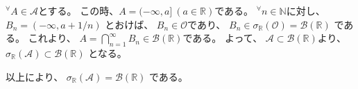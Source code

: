 \documentclass[12pt,b5paper]{ltjsarticle}
\begin{document}
\begin{enumerate}
\begin{enumerate}
            ${}^{\forall}A\in\mathcal{A}$とする。
            この時、$A=(-\infty,a] \ (a\in\mathbb{R})$である。
            ${}^{\forall}n\in\mathbb{N}$に対し、
            $B_{n}=(-\infty,a+1/n)$
            とおけば、
            $B_{n}\in\mathcal{O}$であり、
            $B_{n}\in \sigma_{\mathbb{R}}(\mathcal{O})=\mathcal{B}(\mathbb{R})$
            である。
            これより、
            $A=\bigcap_{n=1}^{\infty}B_{n}\in\mathcal{B}(\mathbb{R})$である。
            よって、
            $\mathcal{A}\subset \mathcal{B}(\mathbb{R})$より、
            $\sigma_{\mathbb{R}}(\mathcal{A}) \subset \mathcal{B}(\mathbb{R})$
            となる。


            以上により、
            $\sigma_{\mathbb{R}}(\mathcal{A}) = \mathcal{B}(\mathbb{R})$
            である。

      \end{enumerate}

\end{enumerate}

\hrulefill
\end{document}

